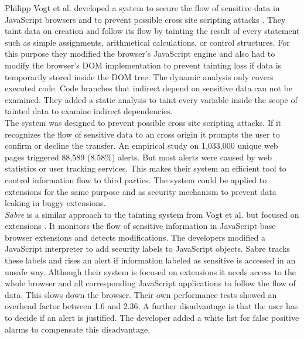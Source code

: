 	Philipp Vogt et al. developed a system to secure the flow of sensitive data in JavaScript browsers and to prevent possible cross site scripting attacks \cite{ndss2007xss} . They taint data on creation and follow its flow by tainting the result of every statement such as simple assignments, arithmetical calculations, or control structures. For this purpose they modified the browser's JavaScript engine and also had to modify the browser's DOM implementation to prevent tainting loss if data is temporarily stored inside the DOM tree. The dynamic analysis only covers executed code. Code branches that indirect depend on sensitive data can not be examined. They added a static analysis to taint every variable inside the scope of tainted data to examine indirect dependencies. \\
	The system was designed to prevent possible cross site scripting attacks. If it recognizes the flow of sensitive data to an cross origin it prompts the user to confirm or decline the transfer. An empirical study on 1,033,000 unique web pages triggered 88,589 (8.58\%) alerts. But most alerts were caused by web statistics or user tracking services. This makes their system an efficient tool to control information flow to third parties. The system could be applied to extensions for the same purpose and as security mechanism to prevent data leaking in buggy extensions. \\
	
	\textit{Sabre} is a similar approach to the tainting system from Vogt et al. but focused on extensions \cite{Dhawan:2009:AIF:1723192.1723250, ndss2007xss}. It monitors the flow of sensitive information in JavaScript base browser extensions and detects modifications. The developers modified a JavaScript interpreter to add security labels to JavaScript objects. Sabre tracks these labels and rises an alert if information labeled as sensitive is accessed in an unsafe way. Although their system is focused on extensions it needs access to the whole browser and all corresponding JavaScript applications to follow the flow of data. This slows down the browser. Their own performance tests showed an overhead factor between 1.6 and 2.36. A further disadvantage is that the user has to decide if an alert is justified. The developer added a white list for false positive alarms to compensate this disadvantage. \\
